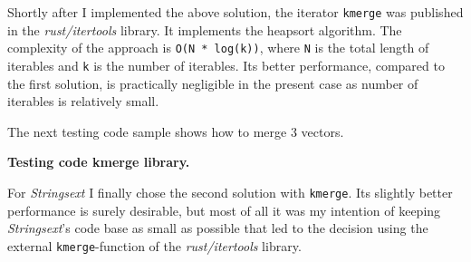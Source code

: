 Shortly after I implemented the above solution, the iterator
\texttt{kmerge} was published in the \emph{rust/itertools} library. It
implements the heapsort algorithm. The complexity of the approach is
\texttt{O(N\ *\ log(k))}, where \texttt{N} is the total length of
iterables and \texttt{k} is the number of iterables. Its better
performance, compared to the first solution, is practically negligible
in the present case as number of iterables is relatively small.

The next testing code sample shows how to merge 3 vectors.

\textbf{Testing code kmerge library.}

\begin{Shaded}
\begin{Highlighting}[]
  
 

\AttributeTok{#[}\AttributeTok{]}
 
     \NormalTok{[}
        \NormalTok{[}\NormalTok{, }\NormalTok{, }\NormalTok{],}
        \NormalTok{[}\NormalTok{, }\NormalTok{, }\NormalTok{],}
        \NormalTok{[}\NormalTok{, }\NormalTok{]}
    \NormalTok{];}

     \NormalTok{<_>>();}

     \NormalTok{[}\NormalTok{, }\NormalTok{, }\NormalTok{, }\NormalTok{, }\NormalTok{, }\NormalTok{, }\NormalTok{, }\NormalTok{];}

     \NormalTok{)}
    \NormalTok{);}
\NormalTok{\}}
\end{Highlighting}
\end{Shaded}

For \emph{Strings­ext} I finally chose the second solution with
\texttt{kmerge}. Its slightly better performance is surely desirable,
but most of all it was my intention of keeping \emph{Strings­ext}'s code
base as small as possible that led to the decision using the external
\texttt{kmerge}-function of the \emph{rust/itertools} library.

